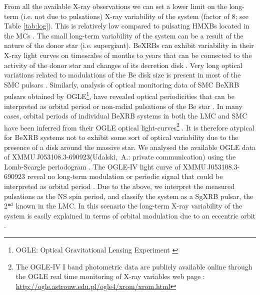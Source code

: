 \documentclass[a4paper,fleqn,usenatbib]{mnras}
\newcommand{\canda}{XMMU\,J053108.3-690923\xspace} %
\begin{document}
From all the available X-ray observations we can set a lower limit on the long-term (i.e. not due to pulsations) X-ray variability of the system (factor of 8; see Table \ref{tab:log}). 
This is relatively low compared to pulsating HMXBs located in the MCs \citep[for SMC systems]{2016A&A...586A..81H}. 
The small long-term variability of the system can be a result of the nature of the donor star (i.e. supergiant).
BeXRBs can exhibit variability in their X-ray light curves on timescales of months to years that can be connected to the activity of the donor star and changes of its decretion disk \citep[e.g.][]{2010MNRAS.401...55R}.
Very long optical variations related to modulations of the Be disk size is present in most of the SMC pulsars \citep{2011MNRAS.413.1600R}. 
Similarly, analysis of optical monitoring data of SMC BeXRB pulsars obtained by OGLE\footnote{OGLE: Optical Gravitational Lensing Experiment \citep{2015AcA....65....1U}}, have revealed optical periodicities that can be interpreted as orbital period or non-radial pulsations of the Be star \citep{2013MNRAS.431..252S,2017MNRAS.467.1526M}.
In many cases, orbital periods of individual BeXRB systems in both the LMC and SMC have been inferred from their OGLE optical light-curves\footnote{The OGLE-IV I band photometric data are publicly available online through the OGLE real time monitoring of X-ray variables web page \citep{2008AcA....58..187U}: \url{http://ogle.astrouw.edu.pl/ogle4/xrom/xrom.html}} \citep[e.g.][]{2016MNRAS.461.1875V,2017MNRAS.470.4354V,2014MNRAS.444.3571S,2017MNRAS.466.1149B}.
It is therefore atypical for BeXRB systems not to exhibit some sort of optical variability due to the presence of a disk around the massive star.
We analysed the available OGLE data of \canda (Udalski,~A.: private communication) using the Lomb-Scargle periodogram \citep{1982ApJ...263..835S,1986ApJ...302..757H}.
The OGLE-IV light curve of \canda reveal no long-term modulation or periodic signal that could be interpreted as orbital period \citep[see also][]{naomi17conf}.
Due to the above, we interpret the measured pulsations as the NS spin period, and classify the system as a SgXRB pulsar, the 2$^{\rm nd}$ known in the LMC. In this scenario the long-term X-ray variability of the system is easily explained in terms of orbital modulation due to an eccentric orbit \citep[e.g.][]{1991ApJ...376..245H}. 
\end{document}
